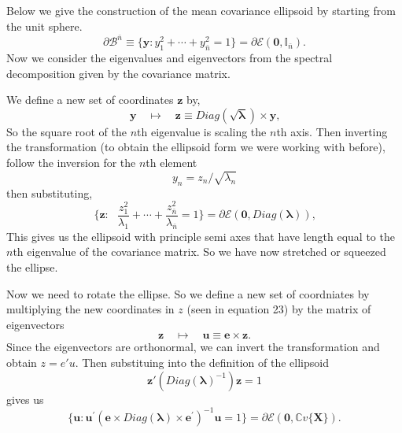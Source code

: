 \documentclass[../main.tex]{subfiles}
\begin{document}
\par Below we give the construction of the mean covariance ellipsoid
by starting from the unit sphere. 
\begin{equation}
    \partial\mathcal{B}^{\bar{n}}\equiv\{\boldsymbol{y}:y_{1}^{2}+\cdots +y_{\bar{n}}^{2}=1\}=\partial\mathcal{E}(\boldsymbol{0},\mathbb{I}_{\bar{n}})\text{.}
    \end{equation}
Now we consider the eigenvalues and eigenvectors from the spectral decomposition
given by the covariance matrix. 
\par We define a new set of coordinates $\mathbf{z}$ by,
\begin{equation}
    \boldsymbol{y}\quad\mapsto\quad\boldsymbol{z}\equiv\mathit{Diag}(\sqrt{\boldsymbol{\lambda}})\times\boldsymbol{y}\text{,}
    \end{equation}
So the square root of the $n$th eigenvalue
is scaling the $n$th axis. Then inverting the transformation (to obtain 
the ellipsoid form we were working with before), follow the inversion for the $n$th element 
\[
y_n = z_n / \sqrt{\lambda_n}
\]
then substituting, 
\begin{equation}
    \{\boldsymbol{z}:\text{\ }\frac{z_{1}^{2}}{\lambda_{1}}+\cdots+\frac{z_{\bar{n}}^{2}}{\lambda_{\bar{n}}}=1\}=\partial\mathcal{E}(\boldsymbol{0},\mathit{Diag}(\boldsymbol{\lambda}))\text{,}
    \end{equation}
This gives us the ellipsoid 
with principle semi axes that have length 
equal to the $n$th eigenvalue of the covariance matrix.
So we have now stretched or squeezed the ellipse.
\par Now we need to rotate the ellipse. So we define a new set of
coordniates by multiplying the new coordinates in $z$ (seen in equation 23)
by the matrix of eigenvectors
\begin{equation}
    \boldsymbol{z}\quad\mapsto\quad\boldsymbol{u}\equiv\boldsymbol{e}\times\boldsymbol{z}\text{.}
    \end{equation}
Since the eigenvectors are orthonormal, we can 
invert the transformation and obtain $z = e'u$. 
Then substituing into the definition of the ellipsoid
\[
\mathbf{z'}(Diag(\mathbf{\lambda})^{-1})\mathbf{z} = 1
\]
gives us 
\begin{equation}
    \{\boldsymbol{u}:\boldsymbol{u}^{\prime}\left( \boldsymbol{e}\times \mathit{Diag}(\boldsymbol{\lambda})\times\boldsymbol{e}^{\prime}\right) ^{-1}\boldsymbol{u}=1\}=\partial\mathcal{E}(\boldsymbol{0},\mathbb{C}v\{\boldsymbol{X}\})\text{.}
    \end{equation}
\end{document}
